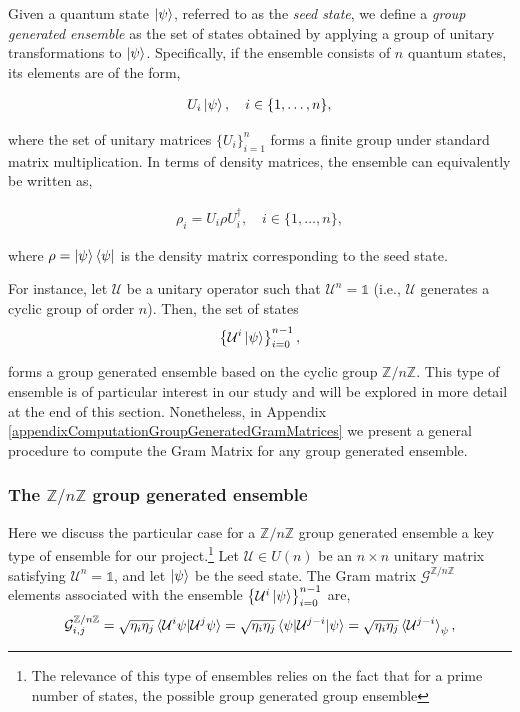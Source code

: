 \documentclass[12pt,letterpaper]{article}
\begin{document}
Given a quantum state $\ket{\psi}$, referred to as the \emph{seed state}, we define a \emph{group generated ensemble} as the set of states obtained by applying a group of unitary transformations to $\ket{\psi}$. Specifically, if the ensemble consists of $n$ quantum states, its elements are of the form,

\begin{align*}
	U_i\ket{\psi}, \quad i \in \{1, \dots, n\},
\end{align*}

where the set of unitary matrices $\{U_i\}_{i=1}^n$ forms a finite group under standard matrix multiplication. In terms of density matrices, the ensemble can equivalently be written as,

\begin{align*}
	\rho_i = U_i \rho U_i^\dagger, \quad i \in \{1, \dots, n\},
\end{align*}

where $\rho = \ket{\psi}\bra{\psi}$ is the density matrix corresponding to the seed state.

For instance, let $\mathcal{U}$ be a unitary operator such that $\mathcal{U}^n = \mathds{1}$ (i.e., $\mathcal{U}$ generates a cyclic group of order $n$). Then, the set of states
\begin{align*}
	\left\{ \mathcal{U}^i\ket{\psi} \right\}_{i=0}^{n-1},
\end{align*}

forms a group generated ensemble based on the cyclic group $\mathbb{Z}/n\mathbb{Z}$. This type of ensemble is of particular interest in our study and will be explored in more detail at the end of this section. Nonetheless, in Appendix \ref{appendixComputationGroupGeneratedGramMatrices} we present a general procedure to compute the Gram Matrix for any group generated ensemble.

\subsubsection*{The $\mathbb{Z}/n\mathbb{Z}$ group generated ensemble}

\hspace{20pt}Here we discuss the particular case for a $\mathbb{Z}/n\mathbb{Z}$ group generated ensemble a key type of ensemble for our project.\footnote{The relevance of this type of ensembles relies on the fact that for a prime number of states, the possible group generated group ensemble } Let $\mathcal{U} \in U(n)$ be an $n \times n$ unitary matrix satisfying $\mathcal{U}^n = \mathds{1}$, and let $\ket{\psi}$ be the seed state. The Gram matrix $\mathcal{G}^{\mathbb{Z}/n\mathbb{Z}}$ elements associated with the ensemble $\left\{\mathcal{U}^i\ket{\psi}\right\}_{i=0}^{n-1}$ are,
\begin{align*}
	\mathcal{G}^{\mathbb{Z}/n\mathbb{Z}}_{i,j} = \sqrt{\eta_i \eta_j}\braket{\mathcal{U}^i\psi | \mathcal{U}^j\psi} = \sqrt{\eta_i \eta_j}\braket{\psi | \mathcal{U}^{j-i} | \psi} = \sqrt{\eta_i \eta_j}\braket{\mathcal{U}^{j-i}}_{\psi},
\end{align*}
\end{document}
